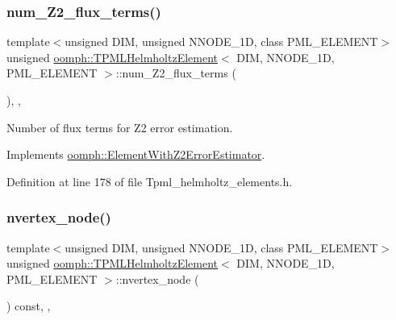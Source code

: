 \subsubsection{\texorpdfstring{num\+\_\+\+Z2\+\_\+flux\+\_\+terms()}{num\_Z2\_flux\_terms()}}
{\footnotesize\ttfamily template$<$unsigned D\+IM, unsigned N\+N\+O\+D\+E\+\_\+1D, class P\+M\+L\+\_\+\+E\+L\+E\+M\+E\+NT$>$ \\
unsigned \hyperlink{classoomph_1_1TPMLHelmholtzElement}{oomph\+::\+T\+P\+M\+L\+Helmholtz\+Element}$<$ D\+IM, N\+N\+O\+D\+E\+\_\+1D, P\+M\+L\+\_\+\+E\+L\+E\+M\+E\+NT $>$\+::num\+\_\+\+Z2\+\_\+flux\+\_\+terms (\begin{DoxyParamCaption}{ }\end{DoxyParamCaption})\hspace{0.3cm}{\ttfamily [inline]}, {\ttfamily [protected]}, {\ttfamily [virtual]}}



Number of \textquotesingle{}flux\textquotesingle{} terms for Z2 error estimation. 



Implements \hyperlink{classoomph_1_1ElementWithZ2ErrorEstimator_ae82c5728902e13da31be19c390fc28e3}{oomph\+::\+Element\+With\+Z2\+Error\+Estimator}.



Definition at line 178 of file Tpml\+\_\+helmholtz\+\_\+elements.\+h.

\mbox{\label{classoomph_1_1TPMLHelmholtzElement_ac3db20cd0947e95920c401d97836cf00}} 
\subsubsection{\texorpdfstring{nvertex\+\_\+node()}{nvertex\_node()}}
{\footnotesize\ttfamily template$<$unsigned D\+IM, unsigned N\+N\+O\+D\+E\+\_\+1D, class P\+M\+L\+\_\+\+E\+L\+E\+M\+E\+NT$>$ \\
unsigned \hyperlink{classoomph_1_1TPMLHelmholtzElement}{oomph\+::\+T\+P\+M\+L\+Helmholtz\+Element}$<$ D\+IM, N\+N\+O\+D\+E\+\_\+1D, P\+M\+L\+\_\+\+E\+L\+E\+M\+E\+NT $>$\+::nvertex\+\_\+node (\begin{DoxyParamCaption}{ }\end{DoxyParamCaption}) const\hspace{0.3cm}{\ttfamily [inline]}, {\ttfamily [protected]}, {\ttfamily [virtual]}}




